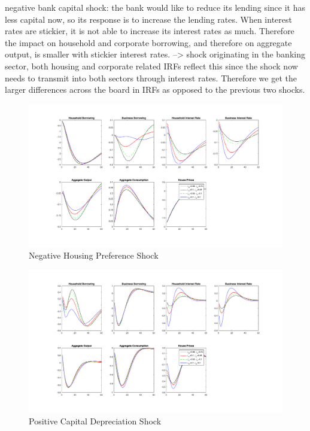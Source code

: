 \documentclass[12pt]{article}
\numberwithin{equation}{section}
\begin{document}
negative bank capital shock: the bank would like to reduce its lending since it has less capital now, so its response is to increase the lending rates. When interest rates are stickier, it is not able to increase its interest rates as much. Therefore the impact on household and corporate borrowing, and therefore on aggregate output, is smaller with stickier interest rates. 
--> shock originating in the banking sector, both housing and corporate related IRFs reflect this since the shock now needs to transmit into both sectors through interest rates. Therefore we get the larger differences across the board in IRFs as opposed to the previous two shocks. 



\begin{figure}[H]
\centering
\caption{Negative Housing Preference Shock}
\label{stickinessJ_figure}
\includegraphics[scale=0.45]{stickinessJ.pdf}
\end{figure}




\begin{figure}[H]
\centering
\caption{Positive Capital Depreciation Shock}
\label{stickinessHk_figure}
\includegraphics[scale=0.5]{stickinessHk.pdf}
\end{figure}
\end{document}
